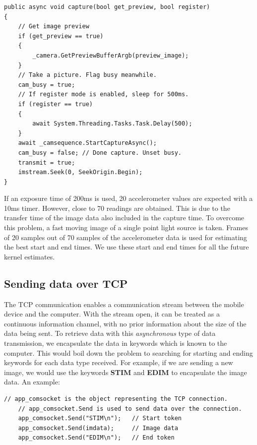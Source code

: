 \documentclass[BTech]{iitmdiss}
\begin{document}
\begin{singlespacing}
\begin{lstlisting}[style=sharpclisting]
public async void capture(bool get_preview, bool register)
{
    // Get image preview
    if (get_preview == true)
    {
        _camera.GetPreviewBufferArgb(preview_image);
    }
    // Take a picture. Flag busy meanwhile.
    cam_busy = true;
    // If register mode is enabled, sleep for 500ms.
    if (register == true)
    {
        await System.Threading.Tasks.Task.Delay(500);
    }
    await _camsequence.StartCaptureAsync();
    cam_busy = false; // Done capture. Unset busy.
    transmit = true;
    imstream.Seek(0, SeekOrigin.Begin);
}
\end{lstlisting}
\end{singlespacing}

If an exposure time of 200ms is used, 20 accelerometer values are 
expected with a 10ms timer. However, close to 70 readings are obtained.
This is due to the transfer time of the image data also included in the
capture time. To overcome this problem, a fast moving image of a single
point light source is taken. Frames of 20 samples out of 70 samples of the
accelerometer data is used for estimating the best start and end times.
We use these start and end times for all the future kernel estimates.

\subsection{Sending data over TCP}
\label{device:device_app:tcp}
The TCP communication enables a communication stream between the mobile
device and the computer. With the stream open, it can be treated as a 
continuous information channel, with no prior information about the size
of the data being sent. To retrieve data with this \emph{asynchronous} type of
data transmission, we encapsulate the data in keywords which is known to
the computer. This would boil down the problem to searching for 
starting and ending keywords for each data type received. For example, if
we are sending a new image, we would use the keywords \textbf{STIM} and
\textbf{EDIM} to encapsulate the image data. An example: 

\begin{singlespacing}
\begin{lstlisting}[style=sharpclisting]
    // app_comsocket is the object representing the TCP connection.
    // app_comsocket.Send is used to send data over the connection.
    app_comsocket.Send("STIM\n");   // Start token
    app_comsocket.Send(imdata);     // Image data
    app_comsocket.Send("EDIM\n");   // End token
\end{lstlisting}
\end{singlespacing}
\end{document}
